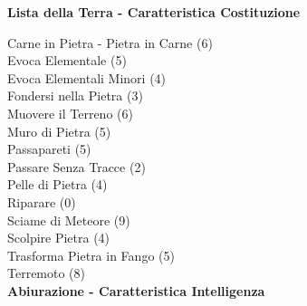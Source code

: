 \begin{multicols}{3}
{	\medskip\textbf{Lista della Terra - Caratteristica Costituzione}

	Carne in Pietra - Pietra in Carne (6)\\
	Evoca Elementale (5)\\
	Evoca Elementali Minori (4)\\
	Fondersi nella Pietra (3)\\
	Muovere il Terreno (6)\\
	Muro di Pietra (5)\\
	Passapareti (5)\\
	Passare Senza Tracce (2)\\
	Pelle di Pietra (4)\\
	Riparare (0)\\
	Sciame di Meteore (9)\\
	Scolpire Pietra (4)\\
	Trasforma Pietra in Fango (5)\\
	Terremoto (8)\\

	\medskip\textbf{Abiurazione - Caratteristica Intelligenza}

}
\end{multicols}
